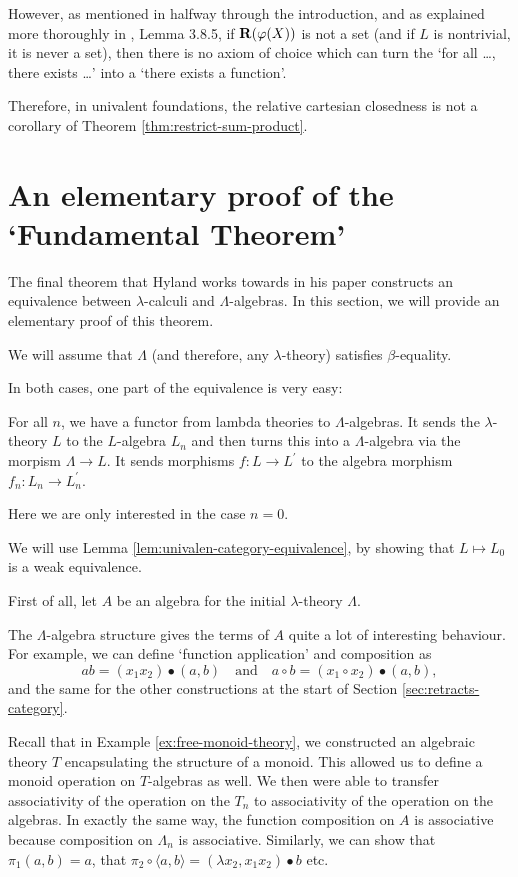 \begin{remark}
  However, as mentioned in \cite{univalent-categories} halfway through the introduction, and as explained more thoroughly in \cite{hottbook}, Lemma 3.8.5, if $ \mathbf{R}(\varphi(X)) $ is not a set (and if $ L $ is nontrivial, it is never a set), then there is no axiom of choice which can turn the `for all \dots, there exists \dots' into a `there exists a function'.

  Therefore, in univalent foundations, the relative cartesian closedness is not a corollary of Theorem \ref{thm:restrict-sum-product}.
\end{remark}

\section{An elementary proof of the `Fundamental Theorem'}

The final theorem that Hyland works towards in his paper constructs an equivalence between $ \lambda $-calculi and $ \Lambda $-algebras. In this section, we will provide an elementary proof of this theorem.

We will assume that $ \Lambda $ (and therefore, any $ \lambda $-theory) satisfies $ \beta $-equality.

In both cases, one part of the equivalence is very easy:
\begin{definition}
  For all $ n $, we have a functor from lambda theories to $ \Lambda $-algebras. It sends the $ \lambda $-theory $ L $ to the $ L $-algebra $ L_n $ and then turns this into a $ \Lambda $-algebra via the morpism $ \Lambda \to L $. It sends morphisms $ f: L \to L^\prime $ to the algebra morphism $ f_n : L_n \to L^\prime_n $.
\end{definition}
Here we are only interested in the case $ n = 0 $.

We will use Lemma \ref{lem:univalen-category-equivalence}, by showing that $ L \mapsto L_0 $ is a weak equivalence.

First of all, let $ A $ be an algebra for the initial $ \lambda $-theory $ \Lambda $.

The $ \Lambda $-algebra structure gives the terms of $ A $ quite a lot of interesting behaviour. For example, we can define `function application' and composition as
\[ a b = (x_1 x_2) \bullet (a, b) \quad \text{and} \quad a \circ b = (x_1 \circ x_2) \bullet (a, b), \]
and the same for the other constructions at the start of Section \ref{sec:retracts-category}.

\begin{remark}
  Recall that in Example \ref{ex:free-monoid-theory}, we constructed an algebraic theory $ T $ encapsulating the structure of a monoid. This allowed us to define a monoid operation on $ T $-algebras as well. We then were able to transfer associativity of the operation on the $ T_n $ to associativity of the operation on the algebras. In exactly the same way, the function composition on $ A $ is associative because composition on $ \Lambda_n $ is associative. Similarly, we can show that $ \pi_1 (a, b) = a $, that $ \pi_2 \circ \langle a, b \rangle = (\lambda x_2, x_1 x_2) \bullet b $ etc.
\end{remark}

